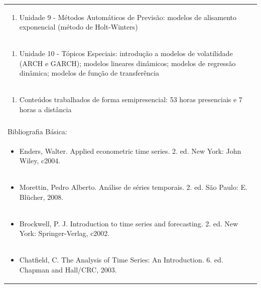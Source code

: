 \documentclass[11pt]{article}
\begin{document}
\begin{center}
\begin{longtable}{|p{4cm}|p{4cm}|p{4cm}|p{4cm}|}
\multicolumn{4}{|p{\dimexpr 16cm + 6\tabcolsep\relax}|}{\begin{enumerate}[start=9]\item Unidade 9 - Métodos Automáticos de Previsão: modelos de alisamento exponencial (método de Holt-Winters)\end{enumerate}}\\
\multicolumn{4}{|p{\dimexpr 16cm + 6\tabcolsep\relax}|}{\begin{enumerate}[start=10]\item Unidade 10 - Tópicos Especiais: introdução a modelos de volatilidade (ARCH e GARCH); modelos lineares dinâmicos; modelos de regressão dinâmica; modelos de função de transferência\end{enumerate}}\\
\multicolumn{4}{|p{\dimexpr 16cm + 6\tabcolsep\relax}|}{\begin{enumerate}[start=11]\item Conteúdos trabalhados de forma semipresencial: 53 horas presenciais e 7 horas a distância\end{enumerate}}\\
\multicolumn{4}{|p{\dimexpr 16cm + 6\tabcolsep\relax}|}{}\\
\hline
\multicolumn{4}{|p{16cm}|}{Bibliografia Básica:}\\*
\multicolumn{4}{|p{\dimexpr 16cm + 6\tabcolsep\relax}|}{\begin{itemize}\item Enders, Walter. Applied econometric time series. 2. ed. New York: John Wiley, c2004.\end{itemize}}\\
\multicolumn{4}{|p{\dimexpr 16cm + 6\tabcolsep\relax}|}{\begin{itemize}\item Morettin, Pedro Alberto. Análise de séries temporais. 2. ed. São Paulo: E. Blücher, 2008.\end{itemize}}\\
\multicolumn{4}{|p{\dimexpr 16cm + 6\tabcolsep\relax}|}{\begin{itemize}\item Brockwell, P. J. Introduction to time series and forecasting. 2. ed. New York: Springer-Verlag, c2002.\end{itemize}}\\
\multicolumn{4}{|p{\dimexpr 16cm + 6\tabcolsep\relax}|}{\begin{itemize}\item Chatfield, C. The Analysis of Time Series: An Introduction. 6. ed. Chapman and Hall/CRC, 2003.\end{itemize}}\\

\end{longtable}
\end{center}
\end{document}
